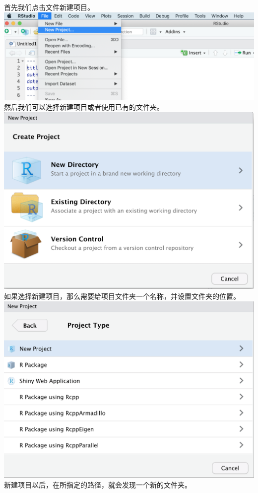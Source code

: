 \documentclass[]{book}
\begin{document}
首先我们点击文件新建项目。
\includegraphics{images/2.9.png}
然后我们可以选择新建项目或者使用已有的文件夹。
\includegraphics{images/2.10.png}
如果选择新建项目，那么需要给项目文件夹一个名称，并设置文件夹的位置。
\includegraphics{images/2.11.png}
新建项目以后，在所指定的路径，就会发现一个新的文件夹。
\end{document}
